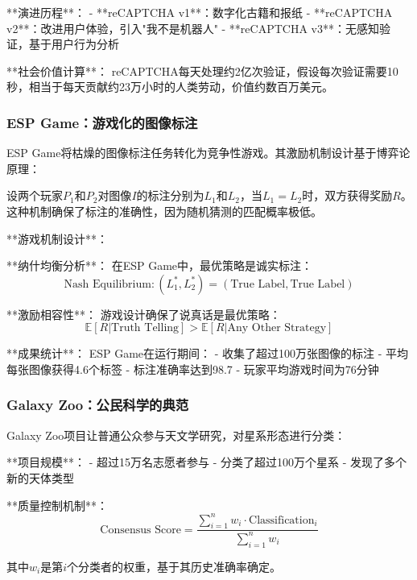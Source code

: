 **演进历程**： %
- **reCAPTCHA v1**：数字化古籍和报纸
- **reCAPTCHA v2**：改进用户体验，引入"我不是机器人"
- **reCAPTCHA v3**：无感知验证，基于用户行为分析

**社会价值计算**： %
reCAPTCHA每天处理约2亿次验证，假设每次验证需要10秒，相当于每天贡献约23万小时的人类劳动，价值约数百万美元。

\subsubsection{ESP Game：游戏化的图像标注}

ESP Game将枯燥的图像标注任务转化为竞争性游戏。其激励机制设计基于博弈论原理：

设两个玩家$P_1$和$P_2$对图像$I$的标注分别为$L_1$和$L_2$，当$L_1 = L_2$时，双方获得奖励$R$。这种机制确保了标注的准确性，因为随机猜测的匹配概率极低。

**游戏机制设计**： %

**纳什均衡分析**：
在ESP Game中，最优策略是诚实标注：
\begin{equation}
\text{Nash Equilibrium}: (L_1^*, L_2^*) = (\text{True Label}, \text{True Label})
\end{equation}

**激励相容性**：
游戏设计确保了说真话是最优策略：
\begin{equation}
\mathbb{E}[R|\text{Truth Telling}] > \mathbb{E}[R|\text{Any Other Strategy}]
\end{equation}

**成果统计**： %
ESP Game在运行期间：
- 收集了超过100万张图像的标注
- 平均每张图像获得4.6个标签
- 标注准确率达到98.7%
- 玩家平均游戏时间为76分钟

\subsubsection{Galaxy Zoo：公民科学的典范} %

Galaxy Zoo项目让普通公众参与天文学研究，对星系形态进行分类：

**项目规模**：
- 超过15万名志愿者参与
- 分类了超过100万个星系
- 发现了多个新的天体类型

**质量控制机制**：
\begin{equation}
\text{Consensus Score} = \frac{\sum_{i=1}^n w_i \cdot \text{Classification}_i}{\sum_{i=1}^n w_i}
\end{equation}

其中$w_i$是第$i$个分类者的权重，基于其历史准确率确定。

